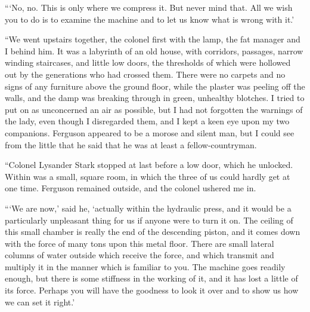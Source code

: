 \documentclass{article}
\begin{document}
```No, no. This is only where we compress it. But never mind that. All
we wish you to do is to examine the machine and to let us know what is
wrong with it.'

``We went upstairs together, the colonel first with the lamp, the fat
manager and I behind him. It was a labyrinth of an old house, with
corridors, passages, narrow winding staircases, and little low doors,
the thresholds of which were hollowed out by the generations who had
crossed them. There were no carpets and no signs of any furniture
above the ground floor, while the plaster was peeling off the walls,
and the damp was breaking through in green, unhealthy blotches. I tried
to put on as unconcerned an air as possible, but I had not forgotten the
warnings of the lady, even though I disregarded them, and I kept a keen
eye upon my two companions. Ferguson appeared to be a morose and silent
man, but I could see from the little that he said that he was at least
a fellow-countryman.

``Colonel Lysander Stark stopped at last before a low door, which he
unlocked. Within was a small, square room, in which the three of us
could hardly get at one time. Ferguson remained outside, and the colonel
ushered me in.

```We are now,' said he, `actually within the hydraulic press, and it
would be a particularly unpleasant thing for us if anyone were to turn it
on. The ceiling of this small chamber is really the end of the descending
piston, and it comes down with the force of many tons upon this metal
floor. There are small lateral columns of water outside which receive the
force, and which transmit and multiply it in the manner which is familiar
to you. The machine goes readily enough, but there is some stiffness in
the working of it, and it has lost a little of its force. Perhaps you will
have the goodness to look it over and to show us how we can set it right.'
\end{document}
